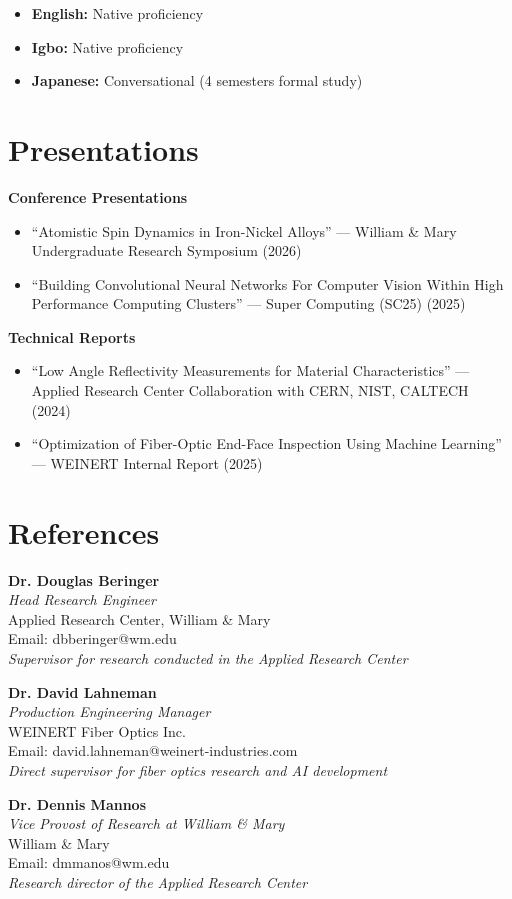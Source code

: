 \documentclass[11pt,letterpaper]{article}
\newcommand{\organization}[1]{\textit{#1}}
\begin{document}
\begin{itemize}
    \item \textbf{English:} Native proficiency
    \item \textbf{Igbo:} Native proficiency
    \item \textbf{Japanese:} Conversational (4 semesters formal study)
\end{itemize}

\section{Presentations}

\noindent
\textbf{Conference Presentations}
\begin{itemize}
    \item ``Atomistic Spin Dynamics in Iron-Nickel Alloys'' — William \& Mary Undergraduate Research Symposium (2026)
    \item ``Building Convolutional Neural Networks For Computer Vision Within High Performance Computing Clusters'' — Super Computing (SC25) (2025)
\end{itemize}

\vspace{6pt}
\noindent
\textbf{Technical Reports}
\begin{itemize}
    \item ``Low Angle Reflectivity Measurements for Material Characteristics'' — Applied Research Center Collaboration with CERN, NIST, CALTECH (2024)
    \item ``Optimization of Fiber-Optic End-Face Inspection Using Machine Learning'' — WEINERT Internal Report (2025)
\end{itemize}

\section{References}

\noindent
\textbf{Dr. Douglas Beringer}\\
\organization{Head Research Engineer}\\
Applied Research Center, William \& Mary\\
Email: dbberinger@wm.edu\\
\textit{Supervisor for research conducted in the Applied Research Center}

\vspace{10pt}
\noindent
\textbf{Dr. David Lahneman}\\
\organization{Production Engineering Manager}\\
WEINERT Fiber Optics Inc.\\
Email: david.lahneman@weinert-industries.com\\
\textit{Direct supervisor for fiber optics research and AI development}

\vspace{10pt}
\noindent
\textbf{Dr. Dennis Mannos}\\
\organization{Vice Provost of Research at William \& Mary}\\
William \& Mary\\
Email: dmmanos@wm.edu\\
\textit{Research director of the Applied Research Center}
\end{document}
